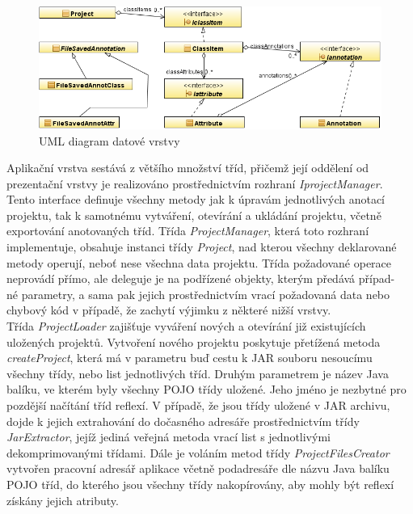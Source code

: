 \documentclass{projekt}
\begin{document}
\begin{figure}[htb!]
\begin{center}
\includegraphics[scale=0.52]{Datova.png}
\caption{UML diagram datové vrstvy}
\end{center}
\end{figure}
\vspace{1.0cm}
Aplikační vrstva sestává z většího množství tříd, přičemž její oddělení od prezentační vrstvy je realizováno prostřednictvím rozhraní {\it IprojectManager}. Tento interface definuje všechny metody jak k úpravám jednotlivých anotací projektu, tak k samotnému vytváření, otevírání a ukládání projektu, včetně exportování anotovaných tříd. Třída {\it ProjectManager}, která toto rozhraní implementuje, obsahuje instanci třídy {\it Project}, nad kterou všechny deklarované metody operují, neboť nese všechna data projektu. Třída požadované operace neprovádí přímo, ale deleguje je na podřízené objekty, kterým předává případ-\\né parametry, a sama pak jejich prostřednictvím vrací požadovaná data nebo chybový kód v případě, že zachytí výjimku z některé nižší vrstvy. \\

Třída {\it ProjectLoader} zajišťuje vyváření nových a otevírání již existujících uložených projektů.
Vytvoření nového projektu poskytuje přetížená metoda {\it createProject}, která má v parametru buď cestu k JAR souboru nesoucímu všechny třídy, nebo list jednotlivých tříd. Druhým parametrem je název Java balíku, ve kterém byly všechny POJO třídy uložené. Jeho jméno je nezbytné pro pozdější načítání tříd reflexí.
V případě, že jsou třídy uložené v JAR archivu, dojde k jejich extrahování do dočasného adresáře prostřednictvím třídy {\it JarExtractor}, jejíž jediná veřejná metoda vrací list s jednotlivými dekomprimovanými třídami. Dále je voláním metod třídy {\it ProjectFilesCreator} vytvořen pracovní adresář aplikace včetně podadresáře dle názvu Java balíku POJO tříd, do kterého jsou všechny třídy nakopírovány, aby mohly být reflexí získány jejich atributy.
\end{document}
